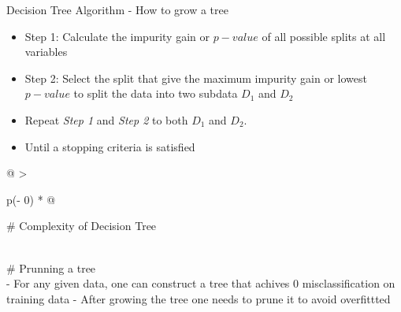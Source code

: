 \documentclass[
  ignorenonframetext,
]{beamer}
\providecommand{\tightlist}{%
  \setlength{\itemsep}{0pt}\setlength{\parskip}{0pt}}
\begin{document}
\begin{frame}{Decision Tree Algorithm - How to grow a tree}
\protect\hypertarget{decision-tree-algorithm---how-to-grow-a-tree}{}
\begin{itemize}
\tightlist
\item
  Step 1: Calculate the impurity gain or \(p-value\) of all possible
  splits at all variables
\item
  Step 2: Select the split that give the maximum impurity gain or lowest
  \(p-value\) to split the data into two subdata \(D_1\) and \(D_2\)
\item
  Repeat \emph{Step 1} and \emph{Step 2} to both \(D_1\) and \(D_2\).
\item
  Until a stopping criteria is satisfied
\end{itemize}

\begin{longtable}[]{@{}
  >{\raggedright\arraybackslash}p{(\columnwidth - 0\tabcolsep) * }@{}}
\toprule
\begin{minipage}[b]{\linewidth}\raggedright
\# Complexity of Decision Tree
\end{minipage} \\
\midrule
\endhead
\# Prunning a tree \\
- For any given data, one can construct a tree that achives 0
misclassification on training data - After growing the tree one needs to
prune it to avoid overfittted \\
\bottomrule
\end{longtable}
\end{frame}
\end{document}
